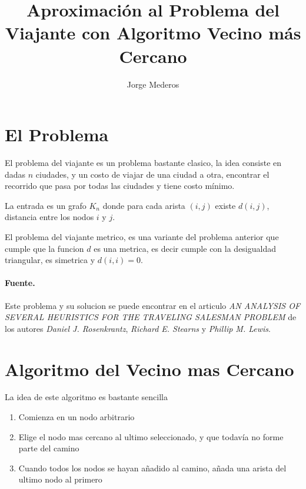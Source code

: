 \documentclass[spanish]{llncs}
\begin{document}
\title{Aproximación al Problema del Viajante con Algoritmo Vecino más Cercano}

\author{Jorge Mederos}


\maketitle

\section{El Problema}

El problema del viajante es un problema bastante clasico, la idea consiste
en dadas $n$ ciudades, y un costo de viajar de una ciudad a otra, encontrar el
recorrido que pasa por todas las ciudades y tiene costo mínimo.

La entrada es un grafo $K_n$ donde para cada arista $(i,j)$ existe $d(i,j)$,
distancia entre los nodos $i$ y $j$.

El problema del viajante metrico, es una variante del problema anterior que cumple
que la funcion $d$ es una metrica, es decir cumple con la desigualdad triangular,
es simetrica y $d(i,i)=0$.

\paragraph*{Fuente.}Este problema y su solucion se puede encontrar
en el articulo \emph{AN ANALYSIS OF SEVERAL HEURISTICS FOR THE TRAVELING
SALESMAN PROBLEM} de los autores \emph{Daniel J. Rosenkrantz}, \emph{Richard E. Stearns}
y \emph{Phillip M. Lewis}.

\section{Algoritmo del Vecino mas Cercano}

La idea de este algoritmo es bastante sencilla

\begin{enumerate}
	\item Comienza en un nodo arbitrario
	\item Elige el nodo mas cercano al ultimo seleccionado, y que todavía no forme 
	      parte del camino
	\item Cuando todos los nodos se hayan añadido al camino, añada una arista del
	      ultimo nodo al primero
\end{enumerate}
\end{document}
